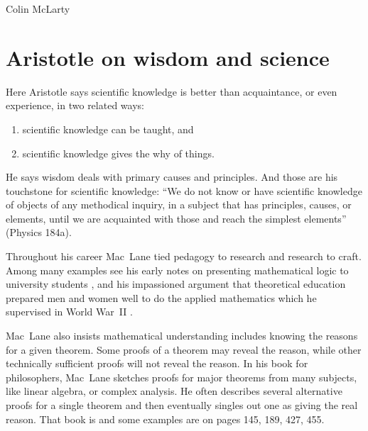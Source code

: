 \begin{artengenv}{Colin McLarty}
\section{Aristotle on wisdom and science}\label{S:Aristotle}

Here Aristotle says scientific knowledge is better than acquaintance, or even experience, in two related ways:
\begin{enumerate}
  \item scientific knowledge can be taught, and
  \item scientific knowledge gives the why of things.
\end{enumerate}
He says wisdom deals with primary causes and principles.  And those are his touchstone for scientific knowledge: ``We do not know or have scientific knowledge of objects of any methodical inquiry, in a subject that has principles, causes, or elements, until we are acquainted with those and reach the simplest elements'' (Physics 184a).

Throughout his career Mac~Lane tied pedagogy to research and research to craft.  Among many examples see his early notes on presenting mathematical logic to university students \parencite{MacLSymbolic}, and his impassioned argument that theoretical education prepared men and women well to do the applied mathematics which he supervised in World War~II \parencite{MacLColumb,MacLReq}.

Mac~Lane also insists mathematical understanding includes knowing the reasons for a given theorem.  Some proofs of a theorem may reveal the reason, while other technically sufficient proofs will not reveal the reason. In his book for philosophers, Mac~Lane sketches proofs for major theorems from many subjects, like linear algebra, or complex analysis.  He often describes several alternative proofs for a single theorem and then eventually singles out one as giving the real reason.  That book is \parencite{MFF} and some examples are on pages 145, 189, 427, 455.


\end{artengenv}
